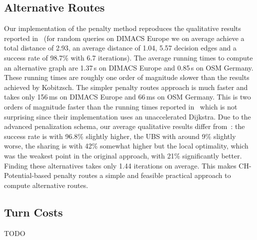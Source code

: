 \documentclass[a4paper, english, cleveref]{lipics-v2021}
\begin{document}
\subsection{Alternative Routes}

Our implementation of the penalty method reproduces the qualitative results reported in~\cite{kobitzsch2015alternative} (for random queries on DIMACS Europe we on average achieve a total distance of 2.93, an average distance of 1.04, 5.57 decision edges and a success rate of 98.7\% with 6.7 iterations).
The average running times to compute an alternative graph are 1.37\,s on DIMACS Europe and 0.85\,s on OSM Germany.
These running times are roughly one order of magnitude slower than the results achieved by Kobitzsch.
The simpler penalty routes approach is much faster and takes only 156\,ms on DIMACS Europe and 66\,ms on OSM Germany.
This is two orders of magnitude faster than the running times reported in~\cite{adgw-arrn-13} which is not surprising since their implementation uses an unaccelerated Dijkstra.
Due to the advanced penalization schema, our average qualitative results differ from~\cite{adgw-arrn-13}: the success rate is with 96.8\% slightly higher, the UBS with around 9\% slightly worse, the sharing is with 42\% somewhat higher but the local optimality, which was the weakest point in the original approach, with 21\% significantly better.
Finding these alternatives takes only 1.44 iterations on average.
This makes CH-Potential-based penalty routes a simple and feasible practical approach to compute alternative routes.

\subsection{Turn Costs}

\begin{table}
\centering
\caption{
TODO
}\label{tab:turn_ops}

\end{table}
\end{document}
